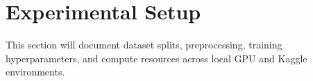 \section{Experimental Setup}
This section will document dataset splits, preprocessing, training hyperparameters, and compute resources across local GPU and Kaggle environments.

